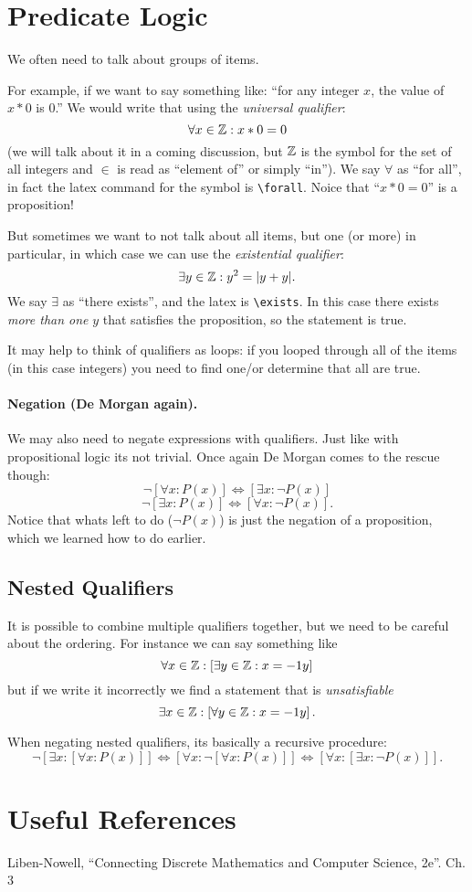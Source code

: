 \section{Predicate Logic}
We often need to talk about groups of items.

For example, if we want to say something like:
``for any integer $x$, the value of $x * 0$ is $0$.''
We would write that using the \emph{universal qualifier}:
\[\forall x\in\operatorname{\mathbb{Z}} : x*0 = 0\]
(we will talk about it in a coming discussion, but $\operatorname{\mathbb{Z}}$ is the symbol for the set of all integers and $\in$ is read as ``element of'' or simply ``in'').
We say $\forall$ as ``for all'', in fact the latex command for the symbol is \texttt{\textbackslash{}forall}.
Noice that ``$x*0 = 0$'' is a proposition!

But sometimes we want to not talk about all items, but one (or more) in particular, in which case we can use the \emph{existential qualifier}:
\[\exists y\in\operatorname{\mathbb{Z}}: y^2 = |y+y|.\]
We say $\exists$ as ``there exists'', and the latex is \texttt{\textbackslash{}exists}. 
In this case there exists \textit{more than one} $y$ that satisfies the proposition, so the statement is true.

It may help to think of qualifiers as loops: 
if you looped through all of the items (in this case integers) you need to find one/or determine that all are true. 

\paragraph{Negation (De Morgan again).}
 We may also need to negate expressions with qualifiers. 
 Just like with propositional logic its not trivial. 
 Once again De Morgan comes to the rescue though: 
 \[\neg \left[\forall x : P(x)\right] \iff \left[\exists x : \neg P(x)\right]\]
 \[\neg \left[\exists x : P(x)\right] \iff \left[\forall x : \neg P(x)\right].\]
 Notice that whats left to do ($\neg P(x)$) is just the negation of a proposition, which we learned how to do earlier. 

 \subsection{Nested Qualifiers}
 It is possible to combine multiple qualifiers together, but we need to be careful about the ordering. 
 For instance we can say something like 
 \[
 \forall x \in \operatorname{\mathbb{Z}} : \left[\exists y \in \operatorname{\mathbb{Z}} : x = -1 y\right]
 \]
 but if we write it incorrectly we find a statement that is \emph{unsatisfiable}
  \[
 \exists x \in \operatorname{\mathbb{Z}} : \left[\forall y \in \operatorname{\mathbb{Z}} : x = -1 y\right].
 \]
 
 When negating nested qualifiers, its basically a recursive procedure: 
  \[\neg \left[\exists x : \left[ \forall x: P(x)\right]\right] \iff \left[\forall x : \neg\left[ \forall x: P(x)\right]\right] \iff \left[\forall x : \left[ \exists x: \neg P(x)\right]\right].\]
  
\section*{Useful References}
Liben-Nowell, ``Connecting Discrete Mathematics and Computer Science, 2e''. Ch. 3 

